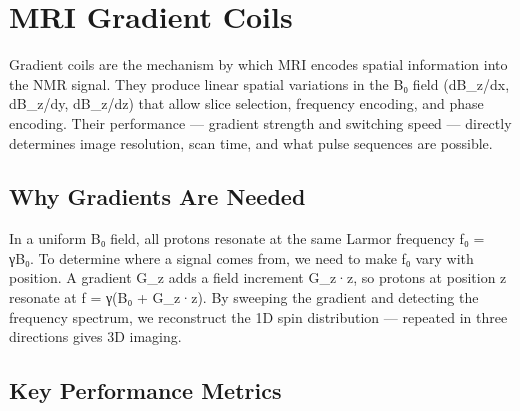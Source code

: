 \section{MRI Gradient Coils}\label{sec:wiki_mri_gradients}



Gradient coils are the mechanism by which MRI encodes spatial information into the NMR signal. They produce linear spatial variations in the B₀ field (dB\_z/dx, dB\_z/dy, dB\_z/dz) that allow slice selection, frequency encoding, and phase encoding. Their performance — gradient strength and switching speed — directly determines image resolution, scan time, and what pulse sequences are possible.

      

\subsection{Why Gradients Are Needed}

      

In a uniform B₀ field, all protons resonate at the same Larmor frequency f₀ = γB₀. To determine where a signal comes from, we need to make f₀ vary with position. A gradient G\_z adds a field increment G\_z·z, so protons at position z resonate at f = γ(B₀ + G\_z·z). By sweeping the gradient and detecting the frequency spectrum, we reconstruct the 1D spin distribution — repeated in three directions gives 3D imaging.


      

\subsection{Key Performance Metrics}

      
        
        
        
        
        
        
        
      

